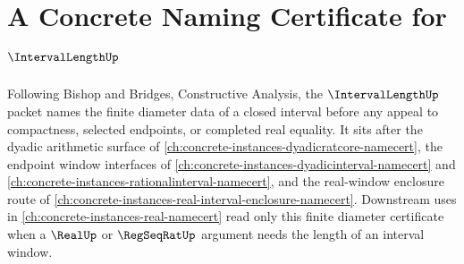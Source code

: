 \chapter{A Concrete Naming Certificate for $\IntervalLengthUp$}
\label{ch:concrete-instances-interval-length-namecert}

Following Bishop and Bridges, Constructive Analysis, the
$\IntervalLengthUp$ packet names the finite diameter data of a closed
interval before any appeal to compactness, selected endpoints, or completed
real equality. It sits after the dyadic arithmetic surface of
\autoref{ch:concrete-instances-dyadicratcore-namecert}, the endpoint window
interfaces of \autoref{ch:concrete-instances-dyadicinterval-namecert} and
\autoref{ch:concrete-instances-rationalinterval-namecert}, and the
real-window enclosure route of
\autoref{ch:concrete-instances-real-interval-enclosure-namecert}. Downstream
uses in \autoref{ch:concrete-instances-real-namecert} read only this finite
diameter certificate when a $\RealUp$ or $\RegSeqRatUp$ argument needs the
length of an interval window.

